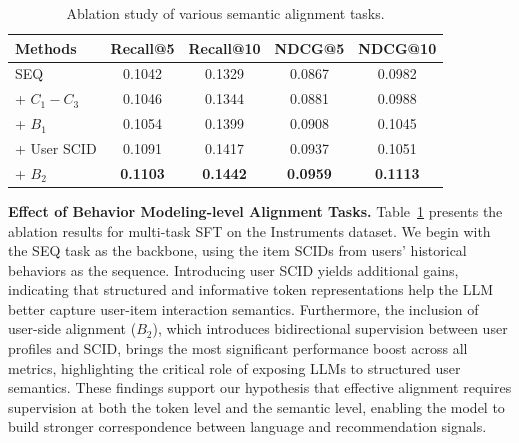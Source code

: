 \documentclass[letterpaper]{article} %
\begin{document}
%
\begin{table}[t]
\centering
\small
\setlength{\tabcolsep}{2.5pt}

\begin{tabular}{l|cccc}
\toprule
\textbf{Methods} &  \textbf{Recall@5} & \textbf{Recall@10} & \textbf{NDCG@5} & \textbf{NDCG@10} \\
\midrule
SEQ               & 0.1042 & 0.1329 & 0.0867 & 0.0982 \\
+ $C_1-C_3$       & 0.1046 & 0.1344 & 0.0881 & 0.0988 \\
+ $B_1$           & 0.1054 & 0.1399 & 0.0908 & 0.1045 \\
\midrule
+ User SCID       & 0.1091 & 0.1417 & 0.0937 & 0.1051 \\
+ $B_2$           & \textbf{0.1103} & \textbf{0.1442} & \textbf{0.0959} & \textbf{0.1113} \\
\bottomrule
\end{tabular}
\caption{Ablation study of various semantic alignment tasks.}
\label{tab:sft}
\end{table}
%

%
\textbf{Effect of Behavior Modeling-level Alignment Tasks.}
Table~\ref{tab:sft} presents the ablation results for multi-task SFT on the Instruments dataset. We begin with the SEQ task as the backbone, using the item SCIDs from users' historical behaviors as the sequence.
%
Introducing user SCID yields additional gains, indicating that structured and informative token representations help the LLM better capture user-item interaction semantics.
%
Furthermore, the inclusion of user-side alignment ($B_2$), which introduces bidirectional supervision between user profiles and SCID, brings the most significant performance boost across all metrics, highlighting the critical role of exposing LLMs to structured user semantics.
%
These findings support our hypothesis that effective alignment requires supervision at both the token level and the semantic level, enabling the model to build stronger correspondence between language and recommendation signals.
%
\end{document}
